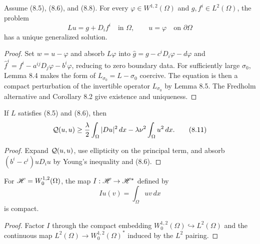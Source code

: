 \begin{theorem}
\label{gt-thm-8-3-solvability-generalized-dirichlet}
Assume (8.5), (8.6), and (8.8). For every $\varphi\in W^{1,2}(\Omega)$ and
$g,f^i\in L^2(\Omega)$, the problem
\[
Lu=g+D_if^i\quad\text{in }\Omega,
\qquad u=\varphi\quad\text{on }\partial\Omega
\]
has a unique generalized solution.
\end{theorem}
\begin{proof}
\sketch Set $w=u-\varphi$ and absorb $L\varphi$ into
$\hat g=g-c^iD_i\varphi-d\varphi$ and
$\hat f^i=f^i-a^{ij}D_j\varphi-b^i\varphi$, reducing to zero boundary data.
For sufficiently large $\sigma_0$, Lemma 8.4 makes the form of
$L_{\sigma_0}=L-\sigma_0$ coercive. The equation is then a compact perturbation
of the invertible operator $L_{\sigma_0}$ by Lemma 8.5. The Fredholm alternative
and Corollary 8.2 give existence and uniqueness.
\end{proof}

\begin{lemma}
\label{gt-lem-8-4-coercivity-estimate}
If $L$ satisfies (8.5) and (8.6), then
\begin{equation}
\mathcal{Q}(u,u)\geq\frac{\lambda}{2}\int_\Omega|Du|^2\,dx
-\lambda\nu^2\int_\Omega u^2\,dx.
\tag{8.11}
\end{equation}
\end{lemma}
\begin{proof}
\sketch Expand $\mathcal{Q}(u,u)$, use ellipticity on the principal term, and absorb
$(b^i-c^i)uD_iu$ by Young's inequality and (8.6).
\end{proof}

\begin{lemma}
\label{gt-lem-8-5-compact-embedding}
For $\mathscr{H}=W_0^{1,2}(\Omega)$, the map $I:\mathscr{H}\to\mathscr{H}^*$ defined by
\begin{equation}
Iu(v)=\int_\Omega uv\,dx
\tag{8.12}
\end{equation}
is compact.
\end{lemma}
\begin{proof}
\sketch Factor $I$ through the compact embedding
$W_0^{1,2}(\Omega)\hookrightarrow L^2(\Omega)$ and the continuous map
$L^2(\Omega)\to W_0^{1,2}(\Omega)^*$ induced by the $L^2$ pairing.
\end{proof}

